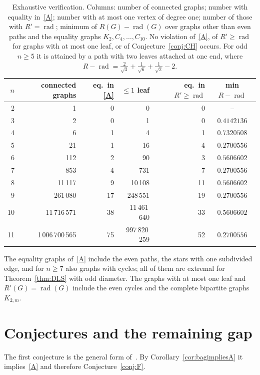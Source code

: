 \documentclass[11pt]{amsart}
\theoremstyle{definition}
\DeclareMathOperator{\rad}{rad}
\newcommand{\Rp}{R'}
\begin{document}
\begin{table}[ht]
\centering
\small
\begin{tabular}{rrrrrc}
\toprule
$n$ & connected graphs & eq.\ in \eqref{A} & $\le1$ leaf & eq.\ in $\Rp\ge\rad$ & min $R-\rad$\\
\midrule
2 & 1 & 0 & 0 & 0 & -- \\
3 & 2 & 0 & 1 & 0 & $0.4142136$\\
4 & 6 & 1 & 4 & 1 & $0.7320508$\\
5 & 21 & 1 & 16 & 4 & $0.2700556$\\
6 & 112 & 2 & 90 & 3 & $0.5606602$\\
7 & 853 & 4 & 731 & 7 & $0.2700556$\\
8 & 11\,117 & 9 & 10\,108 & 11 & $0.5606602$\\
9 & 261\,080 & 17 & 248\,551 & 19 & $0.2700556$\\
10 & 11\,716\,571 & 38 & 11\,461\,640 & 33 & $0.5606602$\\
11 & 1\,006\,700\,565 & 75 & 997\,820\,259 & 52 & $0.2700556$\\
\bottomrule
\end{tabular}
\medskip
\caption{Exhaustive verification. Columns: number of connected graphs; number with equality in~\eqref{A}; number with at
most one vertex of degree one; number of those with $\Rp=\rad$; minimum of $R(G)-\rad(G)$ over graphs other than even
paths and the equality graphs $K_2,C_4,\dots,C_{10}$. No violation of~\eqref{A}, of $\Rp\ge\rad$ for graphs with at most
one leaf, or of Conjecture~\ref{conj:CH} occurs. For odd $n\ge5$ it is attained by a path with two leaves attached at one
end, where $R-\rad=\frac2{\sqrt3}+\frac1{\sqrt6}+\frac1{\sqrt2}-2$.}\label{tab:exh}
\end{table}

The equality graphs of~\eqref{A} include the even paths, the stars with one subdivided edge, and for $n\ge7$ also
graphs with cycles; all of them are extremal for Theorem~\ref{thm:DLS} with odd diameter. The graphs with at most one leaf
and $\Rp(G)=\rad(G)$ include the even cycles and the complete bipartite graphs $K_{2,m}$.

\section{Conjectures and the remaining gap}\label{sec:open}

The first conjecture is the general form of~\cite[Proposition 4.3]{CPS}. By Corollary~\ref{cor:bagimpliesA} it
implies~\eqref{A} and therefore Conjecture~\ref{conj:F}.
\end{document}
